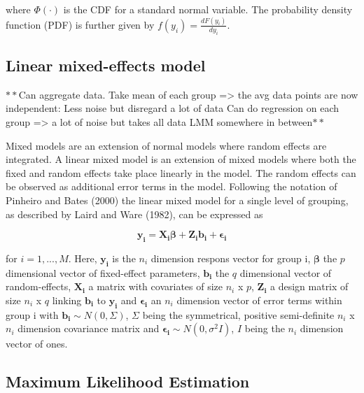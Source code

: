 \documentclass[]{article}
\begin{document}
where \(\Phi(\cdot)\) is the CDF for a standard normal variable. The
probability density function (PDF) is further given by
\(f(y_i)=\frac{dF(y_i)}{dy_i}\).

\subsection{Linear mixed-effects
model}\label{linear-mixed-effects-model}

\(\mathbf{**}\)Can aggregate data. Take mean of each group
=\textgreater{} the avg data points are now independent: Less noise but
disregard a lot of data Can do regression on each group =\textgreater{}
a lot of noise but takes all data LMM somewhere in
between\(\mathbf{**}\)

Mixed models are an extension of normal models where random effects are
integrated. A linear mixed model is an extension of mixed models where
both the fixed and random effects take place linearly in the model. The
random effects can be observed as additional error terms in the model.
Following the notation of Pinheiro and Bates (2000) the linear mixed
model for a single level of grouping, as described by Laird and Ware
(1982), can be expressed as

\[
\mathbf{y_i} = \mathbf{X_i}\mathbf{\beta} + \mathbf{Z_i}\mathbf{b_i} + \mathbf{\epsilon_i}
\]

for \(i = 1,...,M\). Here, \(\mathbf{y_i}\) is the \(n_i\) dimension
respons vector for group i, \(\mathbf{\beta}\) the \(p\) dimensional
vector of fixed-effect parameters, \(\mathbf{b_i}\) the \(q\)
dimensional vector of random-effects, \(\mathbf{X_i}\) a matrix with
covariates of size \(n_i\) x \(p\), \(\mathbf{Z_i}\) a design matrix of
size \(n_i\) x \(q\) linking \(\mathbf{b_i}\) to \(\mathbf{y_i}\) and
\(\mathbf{\epsilon_i}\) an \(n_i\) dimension vector of error terms
within group i with \(\mathbf{b_i}\sim N(0,\Sigma)\), \(\Sigma\) being
the symmetrical, positive semi-definite \(n_i\) x \(n_i\) dimension
covariance matrix and \(\mathbf{\epsilon_i}\sim N(0,\sigma^2I)\), \(I\)
being the \(n_i\) dimension vector of ones.

\subsection{Maximum Likelihood
Estimation}\label{maximum-likelihood-estimation}
\end{document}

